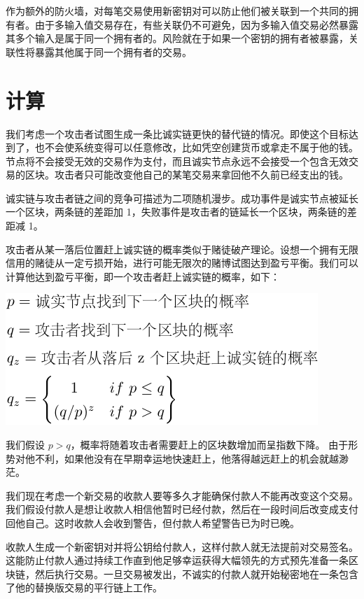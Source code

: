 \documentclass{article}
\begin{document}
作为额外的防火墙，对每笔交易使用新密钥对可以防止他们被关联到一个共同的拥有者。由于多输入值交易存在，有些关联仍不可避免，因为多输入值交易必然暴露其多个输入是属于同一个拥有者的。风险就在于如果一个密钥的拥有者被暴露，关联性将暴露其他属于同一个拥有者的交易。

\section{计算}

我们考虑一个攻击者试图生成一条比诚实链更快的替代链的情况。即使这个目标达到了，也不会使系统变得可以任意修改，比如凭空创建货币或拿走不属于他的钱。节点将不会接受无效的交易作为支付，而且诚实节点永远不会接受一个包含无效交易的区块。攻击者只可能改变他自己的某笔交易来拿回他不久前已经支出的钱。

诚实链与攻击者链之间的竞争可描述为二项随机漫步。成功事件是诚实节点被延长一个区块，两条链的差距加 1，失败事件是攻击者的链延长一个区块，两条链的差距减 1。

攻击者从某一落后位置赶上诚实链的概率类似于赌徒破产理论。设想一个拥有无限信用的赌徒从一定亏损开始，进行可能无限次的赌博试图达到盈亏平衡。我们可以计算他达到盈亏平衡，即一个攻击者赶上诚实链的概率，如下\cite{Feller}：

\begin{center}
 \includegraphics{bitcoin-zh-cn-8}
\end{center}

我们假设 $p > q$，概率将随着攻击者需要赶上的区块数增加而呈指数下降。 由于形势对他不利，如果他没有在早期幸运地快速赶上，他落得越远赶上的机会就越渺茫。

我们现在考虑一个新交易的收款人要等多久才能确保付款人不能再改变这个交易。我们假设付款人是想让收款人相信他暂时已经付款，然后在一段时间后改变成支付回他自己。这时收款人会收到警告，但付款人希望警告已为时已晚。

收款人生成一个新密钥对并将公钥给付款人，这样付款人就无法提前对交易签名。这能防止付款人通过持续工作直到他足够幸运获得大幅领先的方式预先准备一条区块链，然后执行交易。一旦交易被发出，不诚实的付款人就开始秘密地在一条包含了他的替换版交易的平行链上工作。
\end{document}
